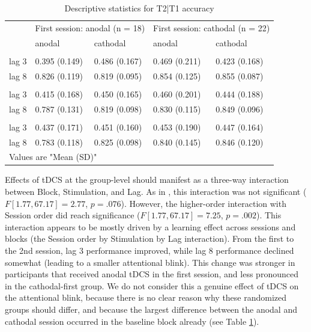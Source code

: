\documentclass[11pt,]{memoir}
\begin{document}
\begin{table}[t]

\caption{\label{tab:tab-descriptives-T2}Descriptive statistics for T2|T1 accuracy}
\centering
\fontsize{10}{12}\selectfont
\begin{tabular}{lllll}
\toprule
\multicolumn{1}{c}{ } & \multicolumn{2}{c}{First session: anodal (n = 18)} & \multicolumn{2}{c}{First session: cathodal (n = 22)} \\
\cmidrule(l{3pt}r{3pt}){2-3} \cmidrule(l{3pt}r{3pt}){4-5}
 & anodal & cathodal & anodal & cathodal\\
\midrule
\addlinespace[0.3em]
\multicolumn{5}{l}{\textbf{baseline}}\\
\hspace{1em}lag 3 & 0.395 (0.149) & 0.486 (0.167) & 0.469 (0.211) & 0.423 (0.168)\\
\hspace{1em}lag 8 & 0.826 (0.119) & 0.819 (0.095) & 0.854 (0.125) & 0.855 (0.087)\\
\addlinespace[0.3em]
\multicolumn{5}{l}{\textbf{tDCS}}\\
\hspace{1em}lag 3 & 0.415 (0.168) & 0.450 (0.165) & 0.460 (0.201) & 0.444 (0.188)\\
\hspace{1em}lag 8 & 0.787 (0.131) & 0.819 (0.098) & 0.830 (0.115) & 0.849 (0.096)\\
\addlinespace[0.3em]
\multicolumn{5}{l}{\textbf{post}}\\
\hspace{1em}lag 3 & 0.437 (0.171) & 0.451 (0.160) & 0.453 (0.190) & 0.447 (0.164)\\
\hspace{1em}lag 8 & 0.783 (0.118) & 0.825 (0.098) & 0.840 (0.145) & 0.846 (0.120)\\
\bottomrule
\multicolumn{5}{l}{Values are "Mean (SD)"}\\
\end{tabular}
\end{table}

Effects of tDCS at the group-level should manifest as a three-way interaction between Block, Stimulation, and Lag. As in \textcite{London2015}, this interaction was not significant (\(F[1.77, 67.17] = 2.77\), \(p = .076\)). However, the higher-order interaction with Session order did reach significance (\(F[1.77, 67.17] = 7.25\), \(p = .002\)). This interaction appears to be mostly driven by a learning effect across sessions and blocks (the Session order by Stimulation by Lag interaction). From the first to the 2nd session, lag 3 performance improved, while lag 8 performance declined somewhat (leading to a smaller attentional blink). This change was stronger in participants that received anodal tDCS in the first session, and less pronounced in the cathodal-first group. We do not consider this a genuine effect of tDCS on the attentional blink, because there is no clear reason why these randomized groups should differ, and because the largest difference between the anodal and cathodal session occurred in the baseline block already (see Table \ref{tab:tab-descriptives-T2}).
\end{document}
